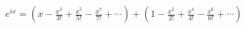 \documentclass[preview]{standalone}
\begin{document}
\begin{align*}
e^{ix}= (x-\frac{x^3}{3!}+\frac{x^5}{5!}-\frac{x^7}{7!}+\cdots)+(1-\frac{x^2}{2!}+\frac{x^4}{4!}-\frac{x^6}{6!}+\cdots)
\end{align*}
\end{document}
